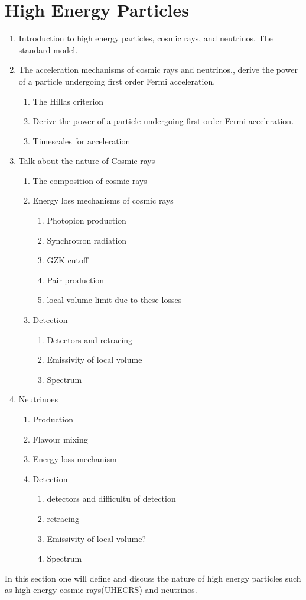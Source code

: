 \section{High Energy Particles}
\begin{enumerate}
    \item Introduction to high energy particles, cosmic rays, and neutrinos. The standard model. 
    \item The acceleration mechanisms of cosmic rays and neutrinos., derive the power of a particle undergoing first order Fermi acceleration.
    \begin{enumerate}
        \item The Hillas criterion
        \item Derive the power of a particle undergoing first order Fermi acceleration.
        \item Timescales for acceleration
    \end{enumerate}
    \item Talk about the nature of Cosmic rays
    \begin{enumerate}
        \item The composition of cosmic rays
        \item Energy loss mechanisms of cosmic rays
        \begin{enumerate}
            \item Photopion production
            \item Synchrotron radiation
            \item GZK cutoff
            \item Pair production
            \item local volume limit due to these losses
        \end{enumerate}
        \item Detection
        \begin{enumerate}
            \item Detectors and retracing
            \item Emissivity of local volume
            \item Spectrum
        \end{enumerate}
    \end{enumerate}
    \item Neutrinoes
    \begin{enumerate}
        \item Production 
        \item Flavour mixing
        \item Energy loss mechanism
        \item Detection
        \begin{enumerate}
            \item detectors and difficultu of detection
            \item retracing
            \item Emissivity of local volume? 
            \item Spectrum 
        \end{enumerate}
    \end{enumerate}

\end{enumerate}

In this section one will define and discuss the nature of high energy particles such as high energy cosmic rays(UHECRS) and neutrinos. 